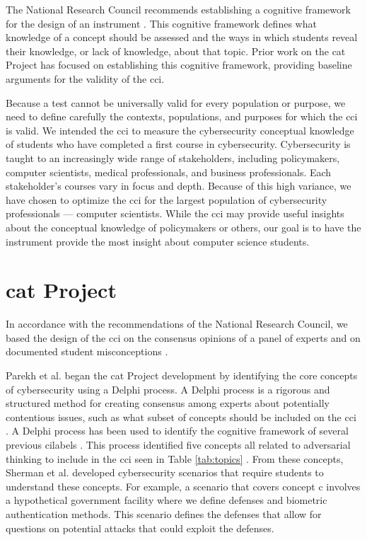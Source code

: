 The National Research Council recommends establishing a cognitive framework for the design of an instrument \cite{knowing_what_students_know}. This cognitive framework defines what knowledge of a concept should be assessed and the ways in which students reveal their knowledge, or lack of knowledge, about that topic. Prior work on the \gls{cat} Project has focused on establishing this cognitive framework, providing baseline arguments for the validity of the \gls{cci}.     
    
Because a test cannot be universally valid for every population or purpose, we need to define carefully the contexts, populations, and purposes for which the \gls{cci} is valid. We intended the \gls{cci} to measure the cybersecurity conceptual knowledge of students who have completed a first course in cybersecurity. Cybersecurity is taught to an increasingly wide range of stakeholders, including policymakers, computer scientists, medical professionals, and business professionals. Each stakeholder's courses vary in focus and depth. Because of this high variance, we have chosen to optimize the \gls{cci} for the largest population of cybersecurity professionals --- computer scientists. While the \gls{cci} may provide useful insights about the conceptual knowledge of policymakers or others, our goal is to have the instrument provide the most insight about computer science students.   

\section{\gls{cat} Project}

In accordance with the recommendations of the National Research Council, we based the design of the \gls{cci} on the consensus opinions of a panel of experts and on documented student misconceptions \cite{jcerp, misconceptions, delphi}.

Parekh et al. \cite{delphi} began the \gls{cat} Project development by identifying the core concepts of cybersecurity using a Delphi process. A Delphi process is a rigorous and structured method for creating consensus among experts about potentially contentious issues, such as what subset of concepts should be included on the \gls{cci} \cite{original_delphi}. A Delphi process has been used to identify the cognitive framework of several previous \glspl{cilabel} \cite{dlci}. This process identified five concepts all related to adversarial thinking to include in the \gls{cci} seen in Table \ref{tab:topics} \cite{delphi}. From these concepts, Sherman et al. \cite{scenarios} developed cybersecurity scenarios that require students to understand these concepts. For example, a scenario that covers concept \gls{c} involves a hypothetical government facility where we define defenses and biometric authentication methods. This scenario defines the defenses that allow for questions on potential attacks that could exploit the defenses.     
     
